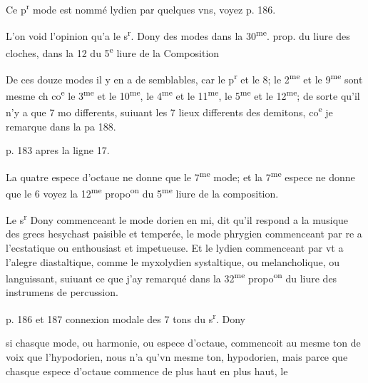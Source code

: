 \documentclass[11pt,a4paper]{article}
\begin{document}
Ce p\textsuperscript{r} mode est nommé lydien par quelques vns, voyez p. 186.

L'on void l'opinion qu'a le s\textsuperscript{r}. Dony des modes dans la 30\textsuperscript{me}. prop. du liure des cloches, \ill{} dans la 12 du 5\textsuperscript{e} liure de la Composition

De ces douze modes il y en a de semblables, car le p\textsuperscript{r} et le 8; le 2\textsuperscript{me} et le 9\textsuperscript{me} sont mesme ch\ill{} co\textsuperscript{e} le 3\textsuperscript{me} et le 10\textsuperscript{me}, le 4\textsuperscript{me} et le 11\textsuperscript{me}, le 5\textsuperscript{me} et le 12\textsuperscript{me}; de sorte qu'il n'y a que 7 mo\ill{} differents, suiuant les 7 lieux differents des demitons, co\textsuperscript{e} je remarque dans la pa\ill{} 188.

p. \struck{\ill{}} 183 apres la ligne 17.

La quatre espece d'octaue ne donne que le 7\textsuperscript{me} mode; et la 7\textsuperscript{me} espece ne donne que le 6 voyez la 12\textsuperscript{me} propo\textsuperscript{on} du 5\textsuperscript{me} liure de la composition.

Le s\textsuperscript{r} Dony commenceant le mode dorien en mi, dit qu'il respond a la musique des grecs hesychast\ill{} paisible et temperée, le mode phrygien commenceant par re a l'ecstatique ou enthousiast\ill{} et impetueuse. Et le lydien commenceant par vt a l'alegre diastaltique, comme le myxolydien systaltique, ou melancholique, ou languissant, suiuant ce que j'ay remarqué dans la 32\textsuperscript{me} propo\textsuperscript{on} du liure des instrumens de percussion.

p. 186 et 187 connexion modale des 7 tons du s\textsuperscript{r}. Dony

si chasque mode, ou harmonie, ou espece d'octaue, commencoit au mesme ton de voix que l'hypodorien, nous n'a\ill{} qu'vn mesme ton, hypodorien, mais parce que chasque espece d'octaue commence de plus haut en plus haut, le\ill{}
\end{document}
